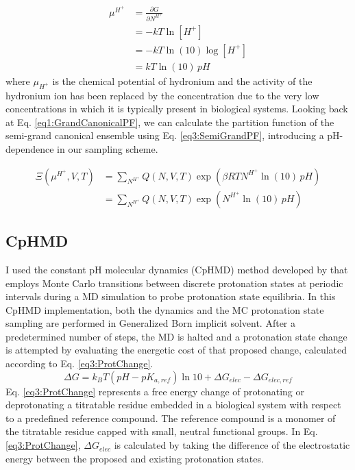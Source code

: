 \begin{align}
   \mu ^ {H^+} & = \frac {\partial G} {\partial N^{H^+}} \nonumber \\
               & = -kT\ln [H^+] \nonumber \\
               & = -kT\ln (10) \log [H^+] \nonumber \\
               & = kT\ln (10)\, pH
   \label{eq3:ChemicalPotential}
\end{align}
where $\mu_{H^+}$ is the chemical potential of hydronium and the activity of the
hydronium ion has been replaced by the concentration due to the very low
concentrations in which it is typically present in biological systems. Looking
back at Eq. \ref{eq1:GrandCanonicalPF}, we can calculate the partition function
of the semi-grand canonical ensemble using Eq. \ref{eq3:SemiGrandPF},
introducing a pH-dependence in our sampling scheme.

\begin{align}
   \Xi(\mu ^ {H^+}, V, T) & = \sum _ {N^{H^+}} Q(N, V, T) \exp(\beta RT N^{H^+}
                  \ln(10)\, pH) \nonumber \\
                          & = \sum _ {N^{H^+}} Q(N, V, T) \exp(N^{H^+} \ln(10)\,
                  pH)
   \label{eq3:SemiGrandPF}
\end{align}

\subsection{CpHMD}

I used the constant pH molecular dynamics (CpHMD) method developed by
\citeauthor{Mongan_JComputChem_2004_v25_p2038}
\cite{Mongan_JComputChem_2004_v25_p2038} that employs Monte Carlo transitions
between discrete protonation states at periodic intervals during a MD simulation
to probe protonation state equilibria. In this CpHMD implementation, both the
dynamics and the MC protonation state sampling are performed in Generalized Born
implicit solvent. After a predetermined number of steps, the MD is halted and a
protonation state change is attempted by evaluating the energetic cost of that
proposed change, calculated according to Eq. \ref{eq3:ProtChange}.
\cite{Mongan_JComputChem_2004_v25_p2038}
\begin{equation}
   \Delta G = k _ B T \left( pH - pK _ {a,ref} \right) \ln 10 + \Delta G _
         {elec} - \Delta G _ {elec,ref}
   \label{eq3:ProtChange}
\end{equation}
Eq. \ref{eq3:ProtChange} represents a free energy change of protonating or
deprotonating a titratable residue embedded in a biological system with respect
to a predefined reference compound. The reference compound is a monomer of the
titratable residue capped with small, neutral functional groups. In Eq.
\ref{eq3:ProtChange}, $\Delta G _ {elec}$ is calculated by taking the difference
of the electrostatic energy between the proposed and existing protonation
states. \cite{Mongan_JComputChem_2004_v25_p2038}

